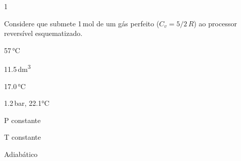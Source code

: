 \documentclass[\mainfilename]{subfiles}
\begin{document}
\begin{questionBox}1{} %
    
    Considere que submete 1\,\unit{\mole} de um gás perfeito (\(C_v = 5/2\,R\)) ao processor reversível esquematizado.

    \begin{enumerate}
        \begin{multicols}{4}
            \item 57\,\unit{\celsius}
            \item 11.5\,\unit{\deci\meter^3}
            \item 17.0\,\unit{\celsius}
            \item 1.2\,\unit{\bar}, 22.1\unit{\celsius}
        \end{multicols}
    \end{enumerate}

    \begin{itemize}[left=3em]
        \begin{multicols}{3}
            \item[1 \to{} 2] P constante
            \item[2 \to{} 3] T constante
            \item[3 \to{} 4] Adiabático
        \end{multicols}
    \end{itemize}
    
\end{questionBox}
\end{document}

